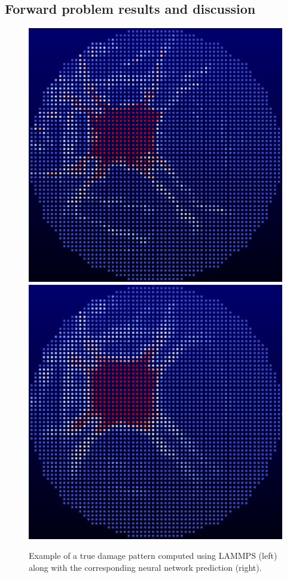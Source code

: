 \subsection{Forward problem results and discussion}
\label{forward_results}

\begin{figure}
  \centering
  \includegraphics[scale=0.25]{figure/true_soln_2300.eps}
  \includegraphics[scale=0.25]{figure/prediction_2300.eps}
\caption{Example of a true damage pattern computed using LAMMPS (left) along with the corresponding neural network prediction (right).}
\label{fig:forward_results}       
\end{figure}


